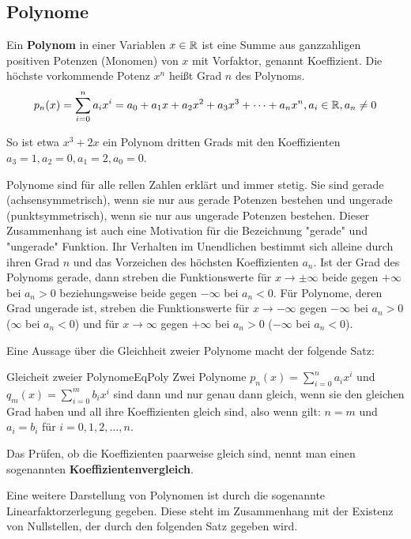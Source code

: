 \subsection{Polynome}

\begin{definition}
    Ein \textbf{Polynom} in einer Variablen $x\in \mathbb{R}$ ist eine Summe aus ganzzahligen positiven Potenzen (Monomen) von $x$ mit Vorfaktor, genannt Koeffizient. Die höchste vorkommende Potenz $x^n$ heißt Grad $n$ des Polynoms.
    $$
        p_n(x) = \sum\limits_{i=0}^n a_i x^i = a_0 + a_1 x + a_2 x^2 + a_3 x^3 + \dots + a_n x^n, a_i \in \mathbb{R}, a_n \ne 0
    $$
\end{definition}

So ist etwa $x^3+2x$ ein Polynom dritten Grads mit den Koeffizienten $a_3 = 1, a_2 = 0, a_1 = 2, a_0=0$.

Polynome sind für alle rellen Zahlen erklärt und immer stetig. Sie sind gerade (achsensymmetrisch), wenn sie nur aus gerade Potenzen bestehen und ungerade (punktsymmetrisch), wenn sie nur aus ungerade Potenzen bestehen. Dieser Zusammenhang ist auch eine Motivation für die Bezeichnung "gerade" und "ungerade" Funktion. Ihr Verhalten im Unendlichen bestimmt sich alleine durch ihren Grad $n$ und das Vorzeichen des höchsten Koeffizienten $a_n$. Ist der Grad des Polynoms gerade, dann streben die Funktionswerte für $x\to\pm\infty$ beide gegen $+\infty$ bei $a_n > 0$ beziehungsweise beide gegen $-\infty$ bei $a_n < 0$. Für Polynome, deren Grad ungerade ist, streben die Funktionswerte für $x \to -\infty$ gegen $-\infty$ bei $a_n > 0$ ($\infty$ bei $a_n < 0$) und für $x \to \infty$ gegen $+\infty$ bei $a_n > 0$ ($-\infty$ bei $a_n < 0$).

Eine Aussage über die Gleichheit zweier Polynome macht der folgende Satz:

\begin{statement}{Gleicheit zweier Polynome}{EqPoly}
    Zwei Polynome $p_n(x) = \sum\limits_{i=0}^n a_i x^i$ und $q_m(x) = \sum\limits_{i=0}^m b_i x^i$ sind dann und nur genau dann gleich, wenn sie den gleichen Grad haben und all ihre Koeffizienten gleich sind, also wenn gilt: $n=m$ und $a_i = b_i$ für $i=0,1,2,\dots,n$.
\end{statement}

Das Prüfen, ob die Koeffizienten paarweise gleich sind, nennt man einen sogenannten \textbf{Koeffizientenvergleich}.

Eine weitere Darstellung von Polynomen ist durch die sogenannte Linearfaktorzerlegung gegeben. Diese steht im Zusammenhang mit der Existenz von Nullstellen, der durch den folgenden Satz gegeben wird.

